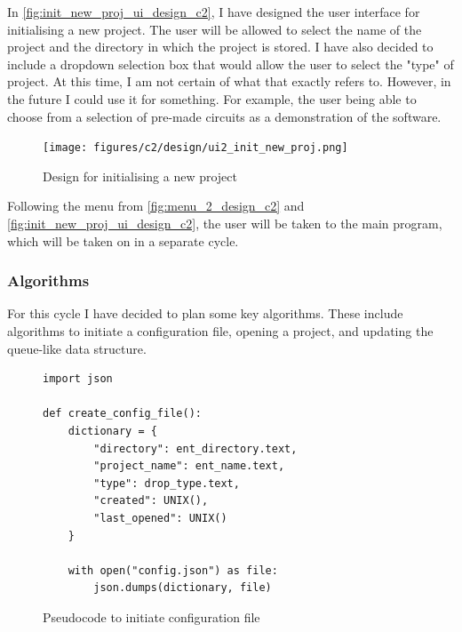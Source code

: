 \documentclass[11pt]{article}
\begin{document}
                In \autoref{fig:init_new_proj_ui_design_c2}, I have designed the user interface for initialising a new project. The user will be allowed to select the name of the project and the directory in which the project is stored. I have also decided to include a dropdown selection box that would allow the user to select the "type" of project. At this time, I am not certain of what that exactly refers to. However, in the future I could use it for something. For example, the user being able to choose from a selection of pre-made circuits as a demonstration of the software.

                \begin{figure}[!ht]
                    \centering
                    \texttt{[image: figures/c2/design/ui2\_init\_new\_proj.png]}
                    \caption{Design for initialising a new project}
                    \label{fig:init_new_proj_ui_design_c2}
                \end{figure}

                Following the menu from \autoref{fig:menu_2_design_c2} and \autoref{fig:init_new_proj_ui_design_c2}, the user will be taken to the main program, which will be taken on in a separate cycle.


            \subsubsection{Algorithms}

                For this cycle I have decided to plan some key algorithms. These include algorithms to initiate a configuration file, opening a project, and updating the queue-like data structure.

                \begin{figure}[!h]
                    \begin{verbatim}
import json

def create_config_file():
    dictionary = {
        "directory": ent_directory.text,
        "project_name": ent_name.text,
        "type": drop_type.text,
        "created": UNIX(),
        "last_opened": UNIX()
    }

    with open("config.json") as file:
        json.dumps(dictionary, file)
                    \end{verbatim}
                    \caption{Pseudocode to initiate configuration file}
                    \label{pc:init_config_file_c2}
                \end{figure}
\end{document}
